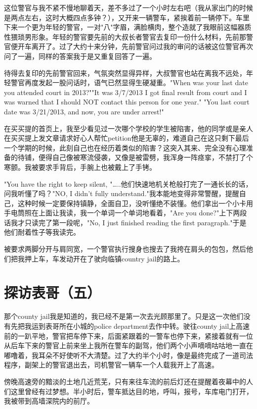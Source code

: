 \documentclass[12pt]{book}
\begin{document}
这位警官与我不紧不慢地聊着天，差不多过了一个小时左右吧（我从家出门的时候是两点左右，这时大概四点多钟？），又开来一辆警车，紧挨着前一辆停下。车里下来一个更为年轻的警官，一对"八"字眉，满脸横肉，整个造就了我眼前这幅器质性猥琐男形象。年轻的警官要先前的大叔长者警官去复印一份什么材料，先前那警官便开车离开了。过了大约十来分钟，先前警官问过我的审问的话被这位警官再次问了一遍，同样的答案我于是又重复回答了一遍。

待得去复印的先前警官回来，气氛突然显得异样，大叔警官也站在离我不远处，年轻警官再度发起一股问话时，语气已然显得生硬凝重。"When was your last date you attended court in 2013?""It was 3/7/2013 I got final result from court and I was warned that I should NOT contact this person for one year." "You last court date was 3/21/2013, and now, you are under arrest!" 

在买买提的首页上，我至少看见过一次哪个学校的学生被陷害，他的同学或是亲人在买买提上发文章请求好心人帮忙petition他是无辜的，难道自己在这只剩下最后一个学期的时候，此刻自己也在经历着类似的陷害？这突入其来、完全没有心理准备的待铺，便得自己像被寒流侵袭，又像是被雷劈，我浑身一阵痉挛，不禁打了个寒颤。我被要求手背后，手腕上也被戴上了手铐。

"You have the right to keep silent, "…..他们快速地机关枪般打完了一通长长的话，问我听懂了吗？"NO, I didn't fully understand."我本能地变得非常警醒，提醒自己，这种时候一定要保持镇静，全面自卫，没听懂绝不装懂。他们拿出一个小卡用手电筒照在上面让我读，我一个单词一个单词地看着，"Are you done?"上下两段话我才只读完了第一段呢，"No, I just finished reading the first paragraph."于是他们耐着性子等我读完。

被要求两脚分开与肩同宽，一个警官执行搜身也搜去了我挎在肩头的包包，然后他们把我押上车，车发动开在了驶向临镇country jail的路上。
\section{探访表哥（五）}
\label{sec-37-5}
那个county jail我是知道的，我已经不是第一次去光顾那里了。只是这一次他们没有先把我运到表哥所在小城的police department去作中转。驶往county jail上高速前的一趴平地，警官把车停下来，后面紧跟着的一警车也停下来，紧接着就有一位从后车下来的警官上前来坐上我所在警车的副驾，他们两个小声嘀嘀咕咕地一直在嘟噜着，我耳朵不好使听不大清楚。过了大约半个小时，像是最终完成了一道司法程序，副架上的警官退出去，司机警官一辆车一个人载我开上了高速。

傍晚高速旁的黯淡的土地几近荒芜，只有来往车流的前后灯还在提醒着夜幕中的人们这里曾经有过梦想。半小时后，警车抵达目的地，呼叫，报号，车库电门打开，我被带到高墙深院内的前厅。
\end{document}

